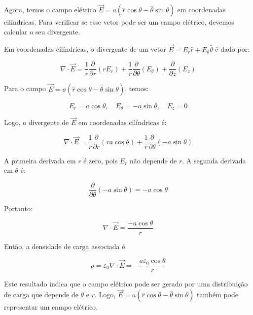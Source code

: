 \documentclass[a4paper,12pt]{article}
\begin{document}
\begin{flushleft}
Agora, temos o campo elétrico \( \vec{E} = a ( \hat{r} \cos \theta - \hat{\theta} \sin \theta ) \) em 
coordenadas cilíndricas. Para verificar se esse vetor pode ser um campo elétrico, devemos calcular o seu divergente.

Em coordenadas cilíndricas, o divergente de um vetor \( \vec{E} = E_r \hat{r} + E_\theta \hat{\theta} \) é dado por:

\begin{equation}
\nabla \cdot \vec{E} = \frac{1}{r} \frac{\partial}{\partial r}(r E_r) + \frac{1}{r} \frac{\partial}{\partial \theta}(E_\theta) + \frac{\partial}{\partial z}(E_z)
\end{equation}

Para o campo \( \vec{E} = a ( \hat{r} \cos \theta - \hat{\theta} \sin \theta ) \), temos:

\begin{equation}
E_r = a \cos \theta, \quad E_\theta = -a \sin \theta, \quad E_z = 0
\end{equation}

Logo, o divergente de \( \vec{E} \) em coordenadas cilíndricas é:

\begin{equation}
\nabla \cdot \vec{E} = \frac{1}{r} \frac{\partial}{\partial r}(r a \cos \theta) + \frac{1}{r} \frac{\partial}{\partial \theta}(-a \sin \theta)
\end{equation}

A primeira derivada em \( r \) é zero, pois \( E_r \) não depende de \( r \). A segunda derivada em \( \theta \) é:

\begin{equation}
\frac{\partial}{\partial \theta}(-a \sin \theta) = -a \cos \theta
\end{equation}

Portanto:

\begin{equation}
\nabla \cdot \vec{E} = \frac{-a \cos \theta}{r}
\end{equation}

Então, a densidade de carga associada é:

\begin{equation}
\rho = \varepsilon_0 \nabla \cdot \vec{E} = -\frac{a \varepsilon_0 \cos \theta}{r}
\end{equation}

Este resultado indica que o campo elétrico pode ser gerado por uma distribuição de carga que depende 
de \( \theta \) e \( r \). Logo, \( \vec{E} = a ( \hat{r} \cos \theta - \hat{\theta} \sin \theta ) \) também 
pode representar um campo elétrico.


\end{flushleft}
\end{document}
